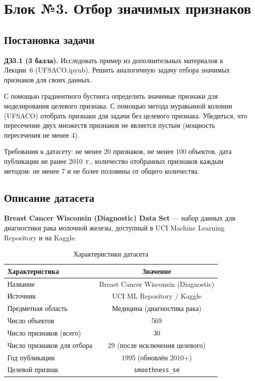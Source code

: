 \section{Блок №3. Отбор значимых признаков}

\subsection{Постановка задачи}

\textbf{ДЗ3.1 (3 балла).} Исследовать пример из дополнительных материалов к Лекции~6 (UFSACO.ipynb). Решить аналогичную задачу отбора значимых признаков для своих данных.

С помощью градиентного бустинга определить значимые признаки для моделирования целевого признака. С помощью метода муравьиной колонии (UFSACO) отобрать признаки для задачи без целевого признака. Убедиться, что пересечение двух множеств признаков не является пустым (мощность пересечения не менее 4).

Требования к датасету: не менее 20 признаков, не менее 100 объектов, дата публикации не ранее 2010~г., количество отобранных признаков каждым методом: не менее 7 и не более половины от общего количества.

\subsection{Описание датасета}

\textbf{Breast Cancer Wisconsin (Diagnostic) Data Set} --- набор данных для диагностики рака молочной железы, доступный в UCI Machine Learning Repository и на Kaggle.

\begin{table}[H]
    \centering
    \caption{Характеристики датасета}
    \label{tab:dataset}
    \begin{tabular}{|l|c|}
        \hline
        \textbf{Характеристика} & \textbf{Значение} \\
        \hline
        Название & Breast Cancer Wisconsin (Diagnostic) \\
        Источник & UCI ML Repository / Kaggle \\
        Предметная область & Медицина (диагностика рака) \\
        Число объектов & 569 \\
        Число признаков (всего) & 30 \\
        Число признаков для отбора & 29 (после исключения целевого) \\
        Год публикации & 1995 (обновлён 2010+) \\
        Целевой признак & \texttt{smoothness\_se} \\
        \hline
    \end{tabular}
\end{table}

